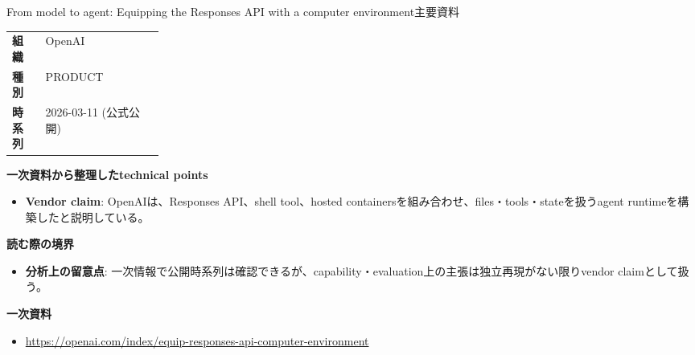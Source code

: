 \begin{technicalnote}{From model to agent: Equipping the Responses API with a computer environment}{主要資料}
\begingroup
\begin{tabularx}{\linewidth}{@{}>{\bfseries}p{0.22\linewidth}X@{}}
組織 & OpenAI \\
種別 & PRODUCT \\
時系列 & 2026-03-11 (公式公開) \\
\end{tabularx}
\smallskip
{\bfseries 一次資料から整理したtechnical points}
\begin{itemize}[leftmargin=1.5em,itemsep=0.35em]
\item \textbf{Vendor claim}: OpenAIは、Responses API、shell tool、hosted containersを組み合わせ、files・tools・stateを扱うagent runtimeを構築したと説明している。
\end{itemize}
\begin{minipage}{\linewidth}
{\bfseries 読む際の境界}
\begin{itemize}[leftmargin=1.5em,itemsep=0.35em]
\item \textbf{分析上の留意点}: 一次情報で公開時系列は確認できるが、capability・evaluation上の主張は独立再現がない限りvendor claimとして扱う。
\end{itemize}
\begin{samepage}
{\bfseries 一次資料}
\begingroup\sloppy
\begin{itemize}[leftmargin=1.5em,itemsep=0.25em]
\item {\scriptsize\url{https://openai.com/index/equip-responses-api-computer-environment}}
\end{itemize}
\endgroup
\end{samepage}
\end{minipage}
\endgroup
\end{technicalnote}
\medskip

